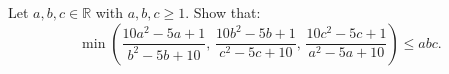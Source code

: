 Let $a,b,c \in \mathbb{R}$ with $a,b,c\geq 1$. Show that:
$$\min \left(\frac{10a^2-5a+1}{b^2-5b+10},\, \frac{10b^2-5b+1}{c^2-5c+10},\, \frac{10c^2-5c+1}{a^2-5a+10}\right )\leq abc.$$